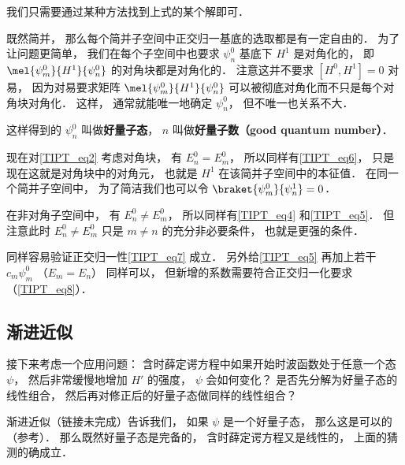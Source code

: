 我们只需要通过某种方法找到上式的某个解即可．

既然简并， 那么每个简并子空间中正交归一基底的选取都是有一定自由的． 为了让问题更简单， 我们在每个子空间中也要求 $\psi_n^0$ 基底下 $H^1$ 是对角化的， 即 $\mel{\psi_m^0}{H^1}{\psi_n^0}$ 的对角块都是对角化的． 注意这并不要求 $[H^0, H^1] = 0$ 对易， 因为对易要求矩阵 $\mel{\psi_m^0}{H^1}{\psi_n^0}$ 可以被彻底对角化而不只是每个对角块对角化． 这样， 通常就能唯一地确定 $\psi_n^0$， 但不唯一也关系不大．

这样得到的 $\psi_n^0$ 叫做\textbf{好量子态}， $n$ 叫做\textbf{好量子数（good quantum number）}．

现在对\autoref{TIPT_eq2} 考虑对角块， 有 $E_n^0 = E_m^0$， 所以同样有\autoref{TIPT_eq6}， 只是现在这就是对角块中的对角元， 也就是 $H^1$ 在该简并子空间中的本征值． 在同一个简并子空间中， 为了简洁我们也可以令 $\braket{\psi_m^0}{\psi_n^1} = 0$．

在非对角子空间中， 有 $E_n^0 \ne E_m^0$， 所以同样有\autoref{TIPT_eq4} 和\autoref{TIPT_eq5}． 但注意此时 $E_n^0 \ne E_m^0$ 只是 $m \ne n$ 的充分非必要条件， 也就是更强的条件．

同样容易验证正交归一性\autoref{TIPT_eq7} 成立． 另外给\autoref{TIPT_eq5} 再加上若干 $c_m \psi_m^0$ （$E_m = E_n$） 同样可以， 但新增的系数需要符合正交归一化要求（\autoref{TIPT_eq8}）．

\subsection{渐进近似}
接下来考虑一个应用问题： 含时薛定谔方程中如果开始时波函数处于任意一个态 $\psi$， 然后非常缓慢地增加 $H'$ 的强度， $\psi$ 会如何变化？ 是否先分解为好量子态的线性组合， 然后再对修正后的好量子态做同样的线性组合？

渐进近似（链接未完成）告诉我们， 如果 $\psi$ 是一个好量子态， 那么这是可以的（参考\cite{GriffQ}）． 那么既然好量子态是完备的， 含时薛定谔方程又是线性的， 上面的猜测的确成立．

